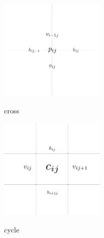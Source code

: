 \begin{clearpagefigure}
  \includegraphics[width=5cm]{fig/cross.png}
  \caption{cross}
  \label{figure:cross}
\end{clearpagefigure}

\begin{clearpagefigure}
  \includegraphics[width=5cm]{fig/cycle.png}
  \caption{cycle}
  \label{figure:cycle}
\end{clearpagefigure}
